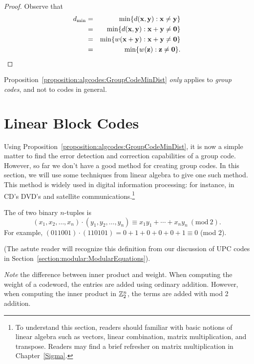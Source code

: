 \begin{proof}
Observe that
\begin{eqnarray*}
d_{\min} &= & \min \{ d({\bold x},{\bold y}) : {\bold x}
\neq
{\bold y} \} \\
&= & \min \{ d({\bold x},{\bold y}) : {\bold x}+{\bold y}
\neq {\bold 0} \} \\
&=& \min\{ w({\bold x} + {\bold y}) : {\bold x}+{\bold y}
\neq {\bold 0} \} \\
& = & \min\{ w({\bold z}) : {\bold z} \neq {\bold 0} \}.
\end{eqnarray*}
\end{proof}
 
 \begin{warn}
 Proposition~\ref{proposition:algcodes:GroupCodeMinDist}  \emph{only} applies to \emph{group codes}, and not to codes in general.
 \end{warn}
 
\section{Linear Block Codes \label{section:algcodes:BlockCodes}}
  
Using Proposition~\ref{proposition:algcodes:GroupCodeMinDist}, it is now a simple matter to find the error detection and correction capabilities of a group code. However, so far we don't have a good method  for creating group codes. In this section, we will use some techniques from linear algebra to give one such method. This method is widely used in digital information processing: for instance, in CD's DVD's and satellite communications.\footnote{To understand this section, readers should familiar with basic notions of linear algebra such as vectors, linear combination, matrix multiplication, and transpose. Readers may find a brief refresher on matrix multiplication in Chapter~\ref{Sigma}.}
 
 \begin{defn}
The  of two binary
$n$-tuples is
\[
(x_1, x_2, \ldots, x_n) \cdot (y_1, y_2, \ldots, y_n) \equiv x_1 y_1 + \cdots + x_n y_n ~(\mathrm{mod~}2).
\]
For example, $(011001) \cdot (110101) = 0+1+0+0+0+1 \equiv 0$ (mod $2$). 

\noindent
(The astute reader will recognize this definition from our discussion of UPC codes in Section~\ref{section:modular:ModularEquations}).
\end{defn}
\emph{Note} the difference between inner product and weight. When computing the weight of a codeword, the entries are added using ordinary addition. However, when computing the inner product  in ${\Bbb Z_2^n}$, the terms are added  with mod 2 addition.


